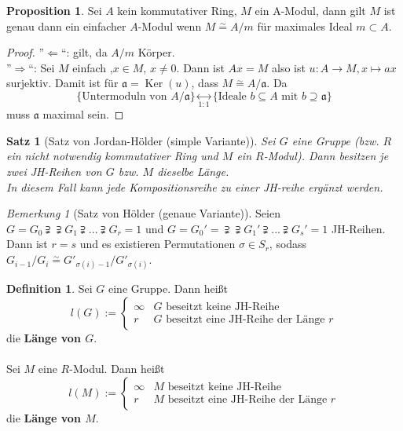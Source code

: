 \documentclass[10pt,a4paper]{article}
\newcommand{\isomorph}{\ensuremath{\overset{\sim}{=}}}
\newcommand{\Ker}{\ensuremath{\operatorname{Ker}}}
\newcounter{thm}[section]
\theoremstyle{definition}
\newtheorem{definition}[thm]{Definition}
\newtheorem{prop}[thm]{Proposition}
\theoremstyle{plain}
\newtheorem{satz}[thm]{Satz}
\theoremstyle{remark}
\newtheorem*{bem*}{Bemerkung}
\begin{document}
\begin{prop}
	Sei $A$ kein kommutativer Ring, $M$ ein A-Modul, dann gilt $M$ ist genau dann ein einfacher $A$-Modul wenn $M\isomorph A/m$ für maximales Ideal $m\subset A$.
\end{prop}

\begin{proof}
	''$\Leftarrow$``: gilt, da $A/m$ Körper.\\
	''$\Rightarrow$``: Sei $M$ einfach ,$x\in M$, $x\neq 0$. Dann ist $Ax=M$ also ist $u:A\rightarrow M,x\mapsto ax$ surjektiv. Damit ist für $\mathfrak a=\Ker(u)$, dass $M\isomorph A/\mathfrak a$. Da
	\[\{\text{Untermoduln von $A/\mathfrak a$}\}\underset{1:1}{\leftrightarrow} \{\text{Ideale $b\subseteq A$ mit $b\supseteq \mathfrak a$}\}\]
	muss $\mathfrak a$ maximal sein.
\end{proof}

\begin{satz}[Satz von Jordan-Hölder (simple Variante)]
	Sei $G$ eine Gruppe (bzw. $R$ ein nicht notwendig kommutativer Ring und $M$ ein $R$-Modul). Dann besitzen je zwei JH-Reihen von $G$ bzw. $M$ dieselbe Länge.\\
	In diesem Fall kann jede Kompositionsreihe zu einer JH-reihe ergänzt werden.
\end{satz}

\begin{bem*}[Satz von Hölder (genaue Variante)]
	Seien $G=G_0\supsetneqq\supsetneqq G_1\supsetneqq ...\supsetneqq G_r=1$ und $G=G_0'=\supsetneqq\supsetneqq G_1'\supsetneqq ...\supsetneqq G_s'=1$ JH-Reihen.\\
	Dann ist $r=s$ und es existieren Permutationen $\sigma\in S_r$, sodass $G_{i-1}/G_i\isomorph G'_{\sigma(i)-1}/G'_{\sigma(i)}$.
\end{bem*}

\begin{definition}
	Sei $G$ eine Gruppe. Dann heißt
	\[l(G):=\begin{cases}
	\infty&\text{$G$ beseitzt keine JH-Reihe}\\
	r&\text{$G$ beseitzt eine JH-Reihe der Länge $r$}
	\end{cases}\]
	die \textbf{Länge von $G$}.\\
	\\
	Sei $M$ eine $R$-Modul. Dann heißt
	\[l(M):=\begin{cases}
	\infty&\text{$M$ beseitzt keine JH-Reihe}\\
	r&\text{$M$ beseitzt eine JH-Reihe der Länge $r$}
	\end{cases}\]
	die \textbf{Länge von $M$}.
\end{definition}
\end{document}

